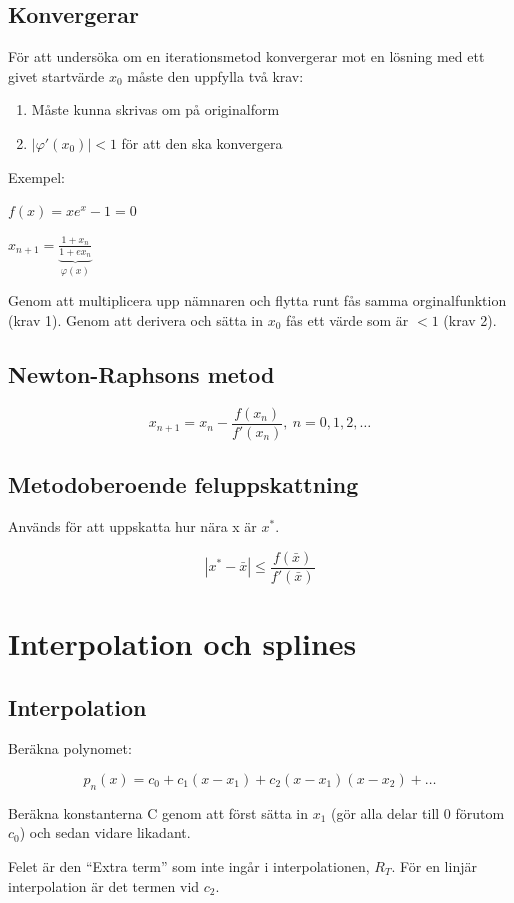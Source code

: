 \documentclass[12pt,a4paper]{article}
\begin{document}
\subsection{Konvergerar}
För att undersöka om en iterationsmetod konvergerar mot en lösning med ett givet startvärde $x_0$ måste den uppfylla två krav:
\begin{enumerate}
	\item{Måste kunna skrivas om på originalform}
	\item{$ |\varphi' (x_0) | < 1 $ för att den ska konvergera}
\end{enumerate}
Exempel:

$ f(x) = xe^x-1 = 0 $

$ x_{n+1} = \underbrace{\frac{1 + x_n}{1 + e{x_n}}}_\text{$\varphi(x)$}$

Genom att multiplicera upp nämnaren och flytta runt fås samma orginalfunktion (krav 1). Genom att derivera och sätta in $x_0$ fås ett värde som är $< 1$ (krav 2).

\subsection{Newton-Raphsons metod}
$$ x_{n+1} = x_n - \frac{f(x_n)}{f'(x_n)}, \: n = 0,1,2,\ldots $$

\subsection{Metodoberoende feluppskattning}
Används för att uppskatta hur nära x är $x^*$.

$$ |x^{*}-\bar{x}| \leq \frac{f(\bar{x})}{f'(\bar{x})} $$

\newpage
\section{Interpolation och splines}
\subsection{Interpolation}

Beräkna polynomet:

$$ p_n(x) = c_0 + c_1(x-x_1) + c_2 (x-x_1)(x-x_2) + \ldots $$

Beräkna konstanterna C genom att först sätta in $x_1$ (gör alla delar till 0 förutom $c_0$) och sedan vidare likadant.

Felet är den ``Extra term'' som inte ingår i interpolationen, $R_T$.
För en linjär interpolation är det termen vid $c_2$.
\end{document}

